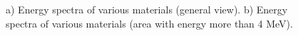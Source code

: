 \documentclass[a4paper]{panl}
\begin{document}
\begin{figure}[t]
    \begin{center} 
        \begin{minipage}[h]{0.49\linewidth}
\end{minipage}
\hfill
\begin{minipage}[h]{0.49\linewidth}
\end{minipage}  
        \vspace{-3mm}
        \caption{a) Energy spectra of various materials (general view). 
        b) Energy spectra of various materials (area with energy more than 4 MeV).}
    \end{center}
    \vspace{-5mm}
\end{figure}
\end{document}
